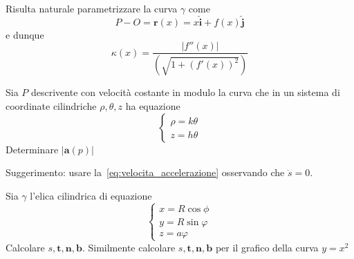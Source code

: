 \begin{example}[\(\gamma\) grafico di una funzione \(y = f{(x)}\) ]
    Risulta naturale parametrizzare la curva \(\gamma\) come
    \[
        P - O = \mathbf{r} {(x)} = x \mathbf{\hat{i}} + f{(x)} \mathbf{\hat{j}}
    \]
    e dunque
    \[
      \kappa{(x)} = \frac{|f''{(x)}|}{{\left( \sqrt{1 + {(f'{(x)})}^2} \right)} }
    \]
\end{example}

\begin{eser}
    Sia \(P\) descrivente con velocità costante in modulo la curva che in un
    sistema di coordinate cilindriche \(\rho, \theta, z\) ha equazione
    \[
      \begin{cases}
          \rho = k \theta \\
          z = h \theta
      \end{cases}
    \]
    Determinare \(|\mathbf{a} {(p)}|\) 
    \tcblower

    Suggerimento: usare la~\eqref{eq:velocita_accelerazione} osservando che \(\ddot{s} = 0\).  
\end{eser}

\begin{eser}
Sia \(\gamma\) l'elica cilindrica di equazione
\[
  \begin{cases}
      x = R \cos\phi \\
      y = R\sin\varphi \\
      z = a \varphi 
  \end{cases}
\]
Calcolare \(s, \mathbf{t}, \mathbf{n} , \mathbf{b} \). Similmente calcolare \(s,
\mathbf{t} , \mathbf{n} , \mathbf{b}\) per il grafico della curva \(y = x^2\) 
\end{eser}

